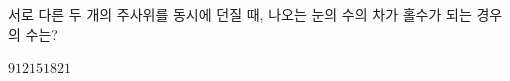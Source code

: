 서로 다른 두 개의 주사위를 동시에 던질 때, 나오는 눈의 수의 차가 홀수가 되는 경우의 수는?
\begin{choices32}{$9$}{$12$}{$15$}{$18$}{$21$}\end{choices32}
